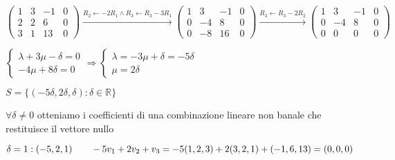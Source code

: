 \documentclass{article}
\newcommand{\R}{\mathbb{R}}
\begin{document}
\begin{enumerate}
\begin{enumerate}
			            $\begin{pmatrix}
					            1 & 3 & -1 & 0 \\
					            2 & 2 & 6  & 0 \\
					            3 & 1 & 13 & 0
				            \end{pmatrix}\xrightarrow{R_2\leftarrow-2R_1\wedge R_3\leftarrow R_3-3R_1}
				            \begin{pmatrix}
					            1 & 3  & -1 & 0 \\
					            0 & -4 & 8  & 0 \\
					            0 & -8 & 16 & 0
				            \end{pmatrix}\xrightarrow{R_3\leftarrow R_3-2R_2}
				            \begin{pmatrix}
					            1 & 3  & -1 & 0 \\
					            0 & -4 & 8  & 0 \\
					            0 & 0  & 0  & 0
				            \end{pmatrix}$

			            $\begin{cases}
					            \lambda+3\mu-\delta=0 \\
					            -4\mu+8\delta=0
				            \end{cases}\Rightarrow
				            \begin{cases}
					            \lambda=-3\mu+\delta=-5\delta \\
					            \mu=2\delta
				            \end{cases}$

			            $S=\{(-5\delta,2\delta,\delta):\delta\in\R\}$

			            $\forall\delta\not=0$ otteniamo i coefficienti di una combinazione lineare non banale che restituisce il vettore nullo

			            $\delta=1:(-5,2,1)\\\qquad-5v_1+2v_2+v_3=-5(1,2,3)+2(3,2,1)+(-1,6,13)=(0,0,0)$
		      \end{enumerate}
	\end{enumerate}
\end{document}
